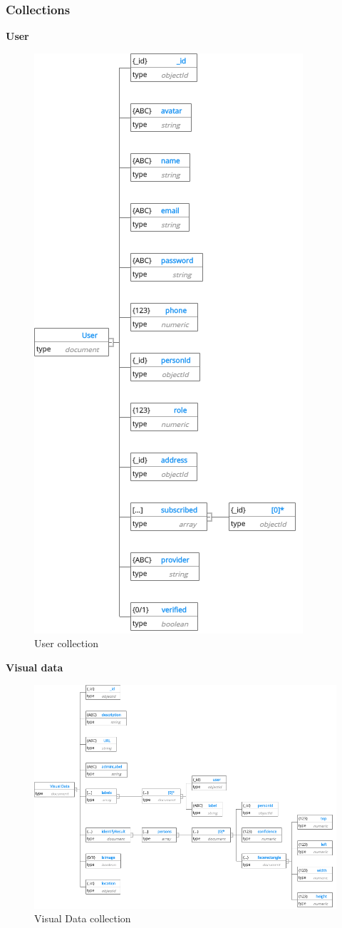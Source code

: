 \subsubsection{Collections}
\textbf{User}
\begin{center}
    \begin{figure}[H]
    \centering
    \includegraphics[width=0.5\columnwidth]{images/chap4/User.png}
    \caption{User collection}
    \end{figure}
\end{center}
\cleardoublepage
\textbf{Visual data}
\begin{center}
    \begin{figure}[H]
    \centering
    \includegraphics[width=1\columnwidth]{images/chap4/Visual.png}
    \caption{Visual Data collection}
    \end{figure}
\end{center}
